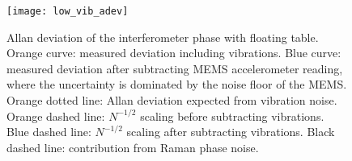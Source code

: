 \nocite{Meunier2015, Fang2016, Dick1990}
\par\noindent
\begin{figure}[htpb!]
  \centering
    \texttt{[image: low\_vib\_adev]}
  \caption[Comparison of Allan deviation in a high and
    low vibration
  environment.]{Allan deviation of the interferometer phase with
    floating table. Orange curve: measured deviation including
    vibrations. Blue curve: measured deviation after subtracting MEMS
    accelerometer reading, where the uncertainty is dominated by the
    noise floor of the MEMS. Orange dotted line: Allan deviation
    expected from vibration noise. Orange dashed line: $N^{-1/2}$
    scaling before subtracting vibrations. Blue dashed line: $N^{-1/2}$
    scaling after subtracting vibrations. Black dashed line:
    contribution from Raman phase noise. }
  \label{fig:low_vib_adev}
\end{figure}

